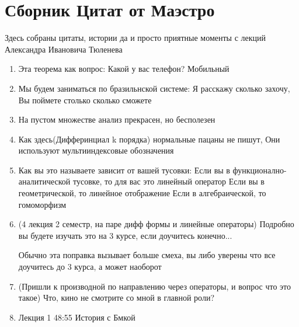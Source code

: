 \newpage

\section{Сборник Цитат от Маэстро}
Здесь собраны цитаты, истории да и просто приятные моменты с лекций Александра Ивановича Тюленева

\begin{enumerate}
    \item Эта теорема как вопрос:
    Какой у вас телефон?
    Мобильный

    \item Мы будем заниматься по бразильнской системе:
    Я расскажу сколько захочу,
    Вы поймете столько сколько сможете

    \item На пустом множестве анализ прекрасен, но бесполезен

    \item Как здесь(Дифферинциал k порядка) нормальные пацаны не пишут, 
    Они используют мультииндексовые обозначения

    \item Как вы это называете зависит от вашей тусовки:
    Если вы в функционално-аналитической тусовке, то для вас это линейный оператор
    Если вы в геометрической, то линейное отображение
    Если в алгебраической, то гомоморфизм
    
    \item (4 лекция 2 семестр, на паре дифф формы и линейные операторы)
    Подробно вы будете изучать это на 3 курсе, если доучитесь конечно...

    Обычно эта поправка вызывает больше смеха, вы либо уверены что все доучитесь до 3 курса, а может наоборот

    \item (Пришли к производной по направлению через операторы, и вопрос что это такое) Что, кино не смотрите со мной в главной роли?

    \item Лекция 1 48:55 История с Бмкой


\end{enumerate}

